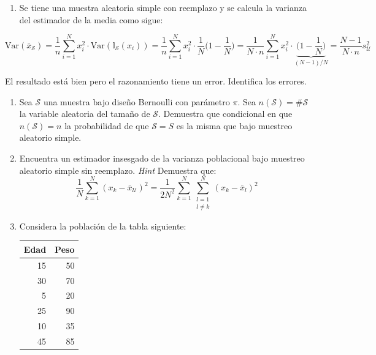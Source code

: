 \documentclass[
]{book}
\providecommand{\tightlist}{%
  \setlength{\itemsep}{0pt}\setlength{\parskip}{0pt}}
\begin{document}
\begin{enumerate}
\def\labelenumi{\arabic{enumi}.}
\setcounter{enumi}{1}
\tightlist
\item
  Se tiene una muestra aleatoria simple con reemplazo y se calcula la varianza del estimador de la media como sigue:
\end{enumerate}

\[
\text{Var}(\bar{x}_{\mathcal{S}}) = \frac{1}{n}\sum\limits_{i = 1}^N x_i^2 \cdot \text{Var}(\mathbb{I}_{\mathcal{S}}(x_i)) =  \frac{1}{n}\sum\limits_{i = 1}^N x_i^2 \cdot \frac{1}{N}\Big(1 - \frac{1}{N}\Big) =  \frac{1}{N\cdot n}\sum\limits_{i = 1}^N x_i^2 \cdot \underbrace{\Big(1 - \frac{1}{N}\Big)}_{(N-1)/N}  = \frac{N-1}{N\cdot n} s^2_{\mathcal{U}}
\]

El resultado está bien pero el razonamiento tiene un error. Identifica los errores.

\begin{enumerate}
\def\labelenumi{\arabic{enumi}.}
\setcounter{enumi}{2}
\item
  Sea \(\mathcal{S}\) una muestra bajo diseño Bernoulli con parámetro \(\pi\). Sea \(n(\mathcal{S}) = \#\mathcal{S}\) la variable aleatoria del tamaño de \(\mathcal{S}\). Demuestra que condicional en que \(n(\mathcal{S}) = n\) la probabilidad de que \(\mathcal{S} = S\) es la misma que bajo muestreo aleatorio simple.
\item
  Encuentra un estimador insesgado de la varianza poblacional bajo muestreo aleatorio simple sin reemplazo. \emph{Hint} Demuestra que:
  \[
  \dfrac{1}{N} \sum\limits_{k = 1}^N (x_k - \bar{x}_{\mathcal{U}})^2 =\dfrac{1}{2N^2} \sum\limits_{k = 1}^N\sum\limits_{\substack{l = 1 \\ l \neq k}}^N (x_k - \bar{x}_{l})^2  
  \]
\item
  Considera la población de la tabla siguiente:

  \begin{table}
  \centering
  \begin{tabular}{r|r}
  \hline
  Edad & Peso\\
  \hline
  15 & 50\\
  \hline
  30 & 70\\
  \hline
  5 & 20\\
  \hline
  25 & 90\\
  \hline
  10 & 35\\
  \hline
  45 & 85\\
  \hline
  \end{tabular}
  \end{table}
\end{enumerate}
\end{document}

